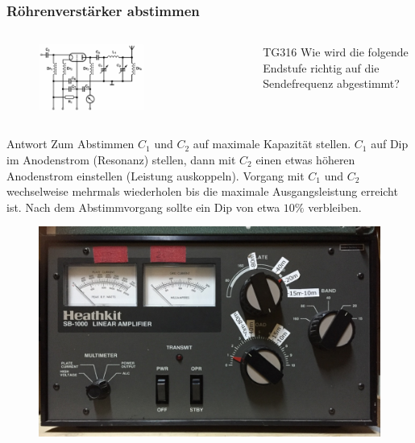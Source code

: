 \begin{frame}
  \frametitle{Röhrenverstärker abstimmen}
  \begin{columns}
    \begin{figure}
      \includegraphics[width=0.6\textwidth,height=.5\textheight,keepaspectratio]{a07/TG313.png}
    \end{figure}
    \begin{center}
      \begin{exampleblock}{TG316}
        Wie wird die folgende Endstufe richtig auf die Sendefrequenz abgestimmt?
      \end{exampleblock}
    \end{center}
  \end{columns}
  \pause
  \begin{exampleblock}{Antwort}
    Zum Abstimmen $C_1$ und $C_2$ auf maximale Kapazität stellen. $C_1$ auf Dip im Anodenstrom (Resonanz) stellen, dann mit $C_2$ einen etwas höheren Anodenstrom einstellen (Leistung auskoppeln). Vorgang mit $C_1$ und $C_2$ wechselweise mehrmals wiederholen bis die maximale Ausgangsleistung erreicht ist. Nach dem Abstimmvorgang sollte ein Dip von etwa $10\%$ verbleiben.
  \end{exampleblock}
\end{frame}

\begin{frame}
  \begin{center}
    \begin{figure}
      \includegraphics[width=\textwidth,height=.8\textheight,keepaspectratio]{a07/Heathkit.jpg}
    \end{figure}
  \end{center}
\end{frame}

